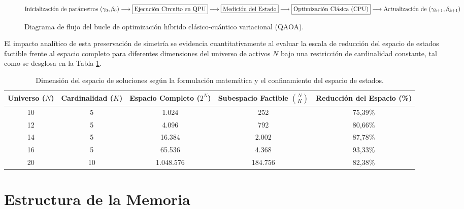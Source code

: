 \begin{figure}[htbp]
    \centering
    \vspace*{0.5cm}
    $\text{Inicialización de parámetros } (\gamma_0, \beta_0) \longrightarrow \framebox{Ejecución Circuito en QPU} \longrightarrow \framebox{Medición del Estado} \longrightarrow \framebox{Optimización Clásica (CPU)} \longrightarrow \text{Actualización de } (\gamma_{k+1}, \beta_{k+1})$
    \vspace*{0.5cm}
    \caption{Diagrama de flujo del bucle de optimización híbrido clásico-cuántico variacional (QAOA).}
    \label{fig:flujo_qaoa}
\end{figure}

El impacto analítico de esta preservación de simetría se evidencia cuantitativamente al evaluar la escala de reducción del espacio de estados factible frente al espacio completo para diferentes dimensiones del universo de activos $N$ bajo una restricción de cardinalidad constante, tal como se desglosa en la Tabla \ref{tab:dimension_espacio}.

\begin{table}[htbp]
    \centering
    \caption{Dimensión del espacio de soluciones según la formulación matemática y el confinamiento del espacio de estados.}
    \label{tab:dimension_espacio}
    \begin{tabular}{ccccc}
        \toprule
        \textbf{Universo ($N$)} & \textbf{Cardinalidad ($K$)} & \textbf{Espacio Completo ($2^N$)} & \textbf{Subespacio Factible $\binom{N}{K}$} & \textbf{Reducción del Espacio (\%)} \\
        \midrule
        10 & 5  & 1.024        & 252       & 75,39\% \\
        12 & 5  & 4.096        & 792       & 80,66\% \\
        14 & 5  & 16.384       & 2.002     & 87,78\% \\
        16 & 5  & 65.536       & 4.368     & 93,33\% \\
        20 & 10 & 1.048.576    & 184.756   & 82,38\% \\
        \bottomrule
    \end{tabular}
\end{table}

\section{Estructura de la Memoria}
\label{sec:estructura_memoria}

